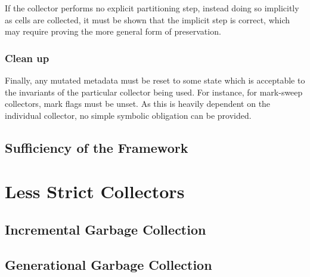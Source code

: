 If the collector performs no explicit partitioning step, instead doing
so implicitly as cells are collected, it must be shown that the
implicit step is correct, which may require proving the more general
form of preservation.

\subsubsection{Clean up}
\label{sec:gc-framework-obligations-clean}

Finally, any mutated metadata must be reset to some state which is
acceptable to the invariants of the particular collector being
used. For instance, for mark-sweep collectors, mark flags must be
unset. As this is heavily dependent on the individual collector, no
simple symbolic obligation can be provided.

\subsection{Sufficiency of the Framework}
\label{sec:gc-framework-sufficiency}


\section{Less Strict Collectors}
\label{sec:gc-lessstrict}


\subsection{Incremental Garbage Collection}
\label{sec:gc-lessstrict-incremental}


\subsection{Generational Garbage Collection}
\label{sec:gc-lessstrict-generational}

